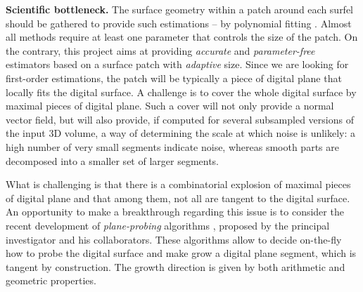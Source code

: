 \noindent\textbf{Scientific bottleneck.}
The surface geometry within a patch around each surfel should be gathered to provide such estimations
-- \eg by polynomial fitting \cite{Cazals2005,Cazals2008}.
Almost all methods require at least one parameter that controls the size of the patch.  
On the contrary, this project aims at providing \emph{accurate} and \emph{parameter-free} estimators
based on a surface patch with \emph{adaptive} size.
Since we are looking for first-order estimations, the patch will be typically a piece of digital plane
that locally fits the digital surface. %
A challenge is to cover the whole digital surface by maximal pieces of digital plane. 
Such a cover will not only provide a normal vector field, but will also provide, if computed
for several subsampled versions of the input 3D volume, a way of determining the scale 
at which noise is unlikely: a high number of very small segments indicate noise, whereas
smooth parts are decomposed into a smaller set of larger segments.    

What is challenging is that there is a combinatorial explosion
of maximal pieces of digital plane \cite{Sivignon2009} and that among them,
not all are tangent to the digital surface.  
An opportunity to make a breakthrough regarding this issue is to consider the recent development
of \emph{plane-probing} algorithms \cite{LPRTCS2016, LPRDGCI2016, LPRJMIV2017},
proposed by the principal investigator and his collaborators.
These algorithms allow to decide
on-the-fly how to probe the digital surface and make grow a digital plane segment,
which is tangent by construction. The growth direction is given by both arithmetic and geometric properties.

